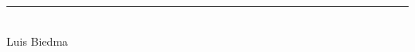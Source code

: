 \documentclass[a4paper,12pt,spanish]{book}
\begin{document}
\begin{center}
\begin{minipage}{0.3\textwidth}
        \rule{0.8\linewidth}{0.4pt}\\
        Luis Biedma
    \end{minipage}
    \end{center}
\vfill
\addtocounter{page}{-1}
\clearpage
\end{document}
